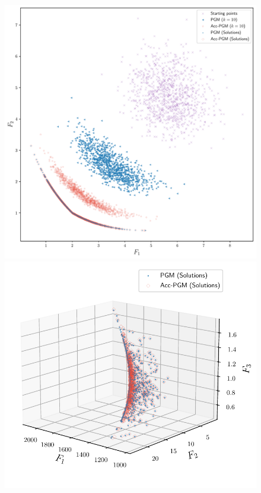 \documentclass[../main]{subfiles}
\begin{document}
\begin{figure}[htbp]
\begin{minipage}[b]{.49\hsize}
        \includegraphics[width=\textwidth]{figs/JOS1_L1.pdf}
    \end{minipage}
    \begin{minipage}[b]{.49\hsize}
        \centering
        \includegraphics[width=\textwidth]{figs/FDS.pdf}

\end{minipage}
\end{figure}
\end{document}
